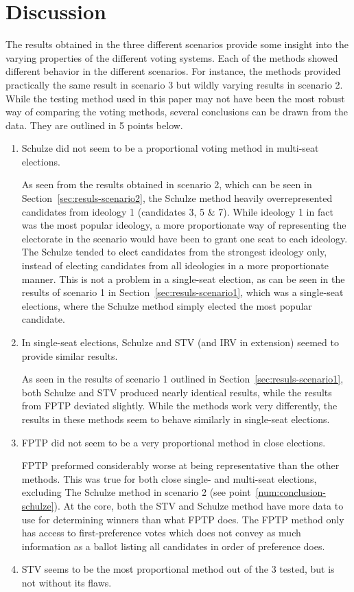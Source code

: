 \documentclass[12pt]{article}
\begin{document}
\section{Discussion}
The results obtained in the three different scenarios provide some insight into the varying properties of the different voting systems. Each of the methods showed different behavior in the different scenarios. For instance, the methods provided practically the same result in scenario 3 but wildly varying results in scenario 2. While the testing method used in this paper may not have been the most robust way of comparing the voting methods, several conclusions can be drawn from the data. They are outlined in 5 points below.
\begin{enumerate}
	\item Schulze did not seem to be a proportional voting method in multi-seat elections.\label{num:conclusion-schulze}
	
	As seen from the results obtained in scenario 2, which can be seen in Section~\ref{sec:resuls-scenario2}, the Schulze method heavily overrepresented candidates from ideology 1 (candidates 3, 5 \& 7). While ideology 1 in fact was the most popular ideology, a more proportionate way of representing the electorate in the scenario would have been to grant one seat to each ideology. The Schulze tended to elect candidates from the strongest ideology only, instead of electing candidates from all ideologies in a more proportionate manner. This is not a problem in a single-seat election, as can be seen in the results of scenario 1 in Section~\ref{sec:resuls-scenario1}, which was a single-seat elections, where the Schulze method simply elected the most popular candidate.
	\item In single-seat elections, Schulze and STV (and IRV in extension) seemed to provide similar results. 
	
	As seen in the results of scenario 1 outlined in Section~\ref{sec:resuls-scenario1}, both Schulze and STV produced nearly identical results, while the results from FPTP deviated slightly. While the methods work very differently, the results in these methods seem to behave similarly in single-seat elections.
	\item FPTP did not seem to be a very proportional method in close elections. 

	FPTP preformed considerably worse at being representative than the other methods. This was true for both close single- and multi-seat elections, excluding The Schulze method in scenario 2 (see point~\ref{num:conclusion-schulze}). At the core, both the STV and Schulze method have more data to use for determining winners than what FPTP does. The FPTP method only has access to first-preference votes which does not convey as much information as a ballot listing all candidates in order of preference does.
	\item STV seems to be the most proportional method out of the 3 tested, but is not without its flaws.


\end{enumerate}
\end{document}
